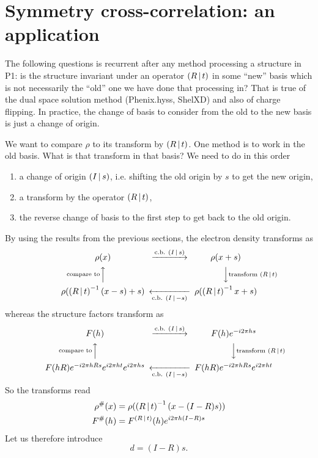 \documentclass[11pt]{article}
\begin{document}
\section{Symmetry cross-correlation: an application}

The following questions is recurrent after any method processing a structure in P1: is the structure invariant under an operator $\left( R\,\vert\, t \right)$ in some ``new'' basis which is not necessarily the ``old'' one we have done that processing in? That is true of the dual space solution method (Phenix.hyss, ShelXD) and also of charge flipping. In practice, the change of basis to consider from the old to the new basis is just a change of origin.

We want to compare $\rho$ to its transform by $\left( R\,\vert\, t \right)$. One method is to work in the old basis. What is that transform in that basis? We need to do in this order
\begin{enumerate}
\item a change of origin $\left( I\,\vert\, s \right)$, i.e. shifting the old origin by $s$ to get the new origin,
\item a transform by the operator $\left( R\,\vert\, t \right)$,
\item the reverse change of basis to the first step to get back to the old origin.
\end{enumerate}
By using the results from the previous sections, the electron density transforms as
\begin{equation*}
\begin{CD}
\rho(x)                                  @>{\text{c.b. } \sym{I}{s}}>>   \rho(x+s)                               \\
@A{\text{compare to}}AA                                      @VV{\text{transform } \sym{R}{t}}V         \\
\rho(\sym{R}{t}^{-1}(x-s) + s)   @<<{\text{c.b. } \sym{I}{-s}}< \rho(\sym{R}{t}^{-1}x + s)
\end{CD}
\end{equation*}
whereas the structure factors transform as
\begin{equation*}
\begin{CD}
F(h)                                  @>{\text{c.b. } \sym{I}{s}}>>   F(h)e^{-i2\pi hs}            \\
@A{\text{compare to}}AA                                      @VV{\text{transform } \sym{R}{t}}V    \\
F(hR)e^{-i2\pi hRs}e^{i2\pi ht}e^{i2\pi hs}   @<<{\text{c.b. } \sym{I}{-s}}< F(hR)e^{-i2\pi hRs}e^{i2\pi ht}
\end{CD}
\end{equation*}
So the transforms read
\begin{align}
\rho^\#(x) &= \rho(\left( R\,\vert\, t \right)^{-1}(x - (I-R)s))\\
F^\#(h) &= F^{\left( R\,\vert\, t \right)}(h) e^{i2\pi h(I-R)s} \label{eqn:translation::search::F}
\end{align}
Let us therefore introduce
\begin{equation}
d = (I-R)s. \label{eqn:def::d}
\end{equation}
\end{document}
